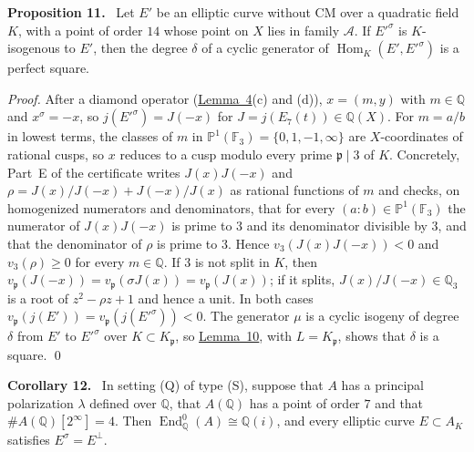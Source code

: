 \documentclass[11pt]{article}
\newenvironment{statement}[1]{\par\medskip\noindent\phantomsection\textbf{#1}\ }{\par\medskip}
\newcommand{\Q}{\mathbb Q}
\newcommand{\F}{\mathbb F}
\DeclareMathOperator{\End}{End}
\DeclareMathOperator{\Hom}{Hom}
\begin{document}
\begin{statement}{Proposition 11.}\label{prop-square}
Let \(E'\) be an elliptic curve without CM over a quadratic field \(K\), with a point of order \(14\) whose point on
\(X\) lies in family \(\mathcal A\). If \(E'^\sigma\) is \(K\)-isogenous to \(E'\), then the degree \(\delta\) of a
cyclic generator of \(\Hom_K(E',E'^\sigma)\) is a perfect square.
\end{statement}

\emph{Proof.} After a diamond operator (\hyperref[lemma-model]{Lemma~4}(c) and (d)), \(x=(m,y)\) with \(m\in\Q\) and
\(x^\sigma=-x\), so \(j(E'^\sigma)=J(-x)\) for
\(J=j(E_7(t))\in\Q(X)\). For \(m=a/b\) in lowest terms, the classes of \(m\) in
\(\mathbb P^1(\F_3)=\{0,1,-1,\infty\}\) are \(X\)-coordinates of rational cusps, so \(x\) reduces to a cusp modulo
every prime \(\mathfrak p\mid3\) of \(K\). Concretely, Part~E of the certificate writes \(J(x)J(-x)\) and
\(\rho=J(x)/J(-x)+J(-x)/J(x)\) as rational functions of \(m\) and checks, on homogenized numerators and denominators,
that for every \((a:b)\in\mathbb P^1(\F_3)\) the numerator of \(J(x)J(-x)\) is prime to \(3\) and its denominator
divisible by \(3\), and that the denominator of \(\rho\) is prime to \(3\). Hence \(v_3(J(x)J(-x))<0\) and
\(v_3(\rho)\ge0\) for every \(m\in\Q\). If \(3\) is not split in \(K\), then
\(v_{\mathfrak p}(J(-x))=v_{\mathfrak p}(\sigma J(x))=v_{\mathfrak p}(J(x))\); if it splits, \(J(x)/J(-x)\in\Q_3\)
is a root of \(z^2-\rho z+1\) and hence a unit. In both cases
\(v_{\mathfrak p}(j(E'))=v_{\mathfrak p}(j(E'^\sigma))<0\). The generator \(\mu\) is a cyclic isogeny of degree
\(\delta\) from \(E'\) to \(E'^\sigma\) over \(K\subset K_{\mathfrak p}\), so \hyperref[lemma-tate]{Lemma~10}, with
\(L=K_{\mathfrak p}\), shows that \(\delta\) is a square. \qed

\begin{statement}{Corollary 12.}\label{cor-imag}
In setting (Q) of type (S), suppose that \(A\) has a principal polarization \(\lambda\) defined over \(\Q\), that
\(A(\Q)\) has a point of order \(7\) and that \(\#A(\Q)[2^\infty]=4\). Then \(\End^0_{\Q}(A)\cong\Q(i)\), and every
elliptic curve \(E\subset A_K\) satisfies \(E^\sigma=E^\perp\).
\end{statement}
\end{document}
